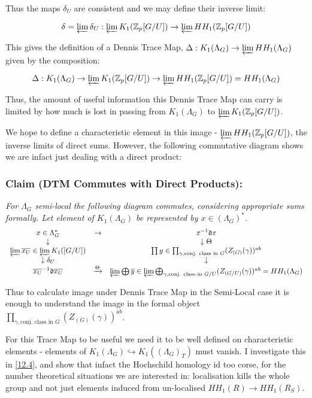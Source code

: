 Thus the maps $\delta_U$ are consistent and we may define their inverse limit:

$$ \delta = \varprojlim \delta_U : \varprojlim  K_1(\mathbb Z_p [ G/U])\rightarrow  \varprojlim  HH_1(\mathbb Z_p [ G/U])$$

This gives the definition of a Dennis Trace Map, $ \Delta: K_1(\Lambda_G)\rightarrow  \varprojlim  HH_1(\Lambda_G)$ given by the composition:
 
$$\Delta: K_1(\Lambda_G)\rightarrow \varprojlim  K_1(\mathbb Z_p [ G/U])\rightarrow  \varprojlim  HH_1(\mathbb Z_p [ G/U]) = HH_1(\Lambda_G)$$

Thus, the amount of useful information this Dennis Trace Map can carry is limited by how much is lost in passing from $K_1(\Lambda_G)$ to $\varprojlim  K_1(\mathbb Z_p [ G/U])$.

We hope to define a characteristic element in this image - $ \varprojlim  HH_1(\mathbb Z_p [ G/U])$, the inverse limits of direct sums. However, the following commutative diagram shows we are infact just dealing with a direct product:

\subsubsection*{Claim (DTM Commutes with Direct Products):}
\emph{For $\Lambda_G$ semi-local the following diagram commutes, considering appropriate sums formally. Let element of $K_1(\Lambda_G)$ be represented by $x\in (\Lambda_G)^*$.
$$\begin{array}{ccc}
x\in \Lambda_G^*	& \rightarrow 	& x^{-1}\mathfrak d x\\
\downarrow      		&			& \downarrow \Theta \\
\varprojlim \overline {x_U}\in \varprojlim K_1([G/U]) & & \prod y \in \prod_{\gamma , \text{conj. class in }G} (Z_{(G)}(\gamma))^{ab}  \\
\downarrow \delta_U	&			& \downarrow\\
\overline{x_U}^{-1}\mathfrak d \overline{x_U} & \xrightarrow {\Theta} & \varprojlim \bigoplus \overline y \in \varprojlim \bigoplus_{\gamma , \text{conj. class in }G/U} (Z_{(G/U)}(\gamma))^{ab} = HH_1(\Lambda_G)
\end{array}$$}

Thus to calculate image under Dennis Trace Map in the Semi-Local case it is enough to understand the image in the formal object $\prod_{\gamma , \text{conj. class in }G} (Z_{(G)}(\gamma))^{ab}$. 

For this Trace Map to be useful we need it to be well defined on characteristic elements - elements of $K_1(\Lambda_G)\hookrightarrow K_1((\Lambda_G)_T)$ must vanish. I investigate this in \ref{12.4}, and show that infact the Hochschild homology id too corse, for the number theoretical situations we are interested in: localisation kills the whole group and not just elements induced from un-localised $HH_1(R)\rightarrow HH_1(R_S)$.


